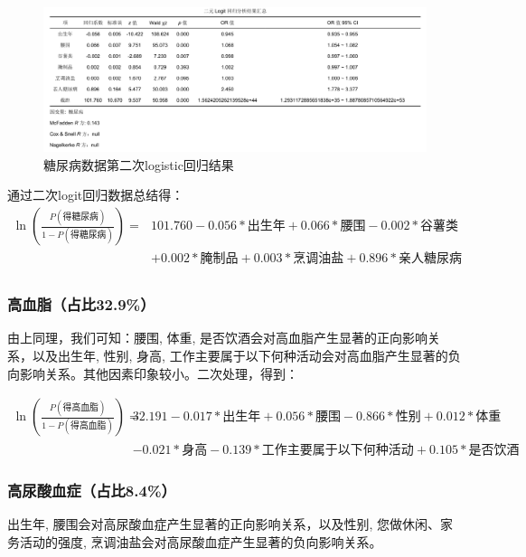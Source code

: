 \documentclass{article}
\numberwithin{equation}{subsection}
\begin{document}
\begin{figure}[H]
    \centering
    \includegraphics[scale=0.78]{logit4.png}
    \caption{糖尿病数据第二次logistic回归结果}
\end{figure}

通过二次logit回归数据总结得：
\begin{equation*}
    \begin{aligned}
        \ln(\frac{P(\text{得糖尿病})}{1-P(\text{得糖尿病})})
        =&101.760-0.056*\text{出生年} + 0.066*\text{腰围}-0.002*\text{谷薯类} \\
        &+ 0.002*\text{腌制品} + 0.003*\text{烹调油盐} + 0.896*\text{亲人糖尿病}\\
    \end{aligned}
\end{equation*}

\subsubsection{高血脂（占比32.9\%）}
由上同理，我们可知：腰围, 体重, 是否饮酒会对高血脂产生显著的正向影响关系，以及出生年, 性别, 身高, 工作主要属于以下何种活动会对高血脂产生显著的负向影响关系。其他因素印象较小。二次处理，得到：

\begin{equation*}
    \begin{aligned}
        \ln(\frac{P(\text{得高血脂})}{1-P(\text{得高血脂})})
        =&32.191-0.017*\text{出生年} + 0.056*\text{腰围}-0.866*\text{性别} + 0.012*\text{体重}\\&-0.021*\text{身高}-0.139*\text{工作主要属于以下何种活动} + 0.105*\text{是否饮酒}
    \end{aligned}
\end{equation*}

\subsubsection{高尿酸血症（占比8.4\%）}

出生年, 腰围会对高尿酸血症产生显著的正向影响关系，以及性别, 您做休闲、家务活动的强度, 烹调油盐会对高尿酸血症产生显著的负向影响关系。
\end{document}
